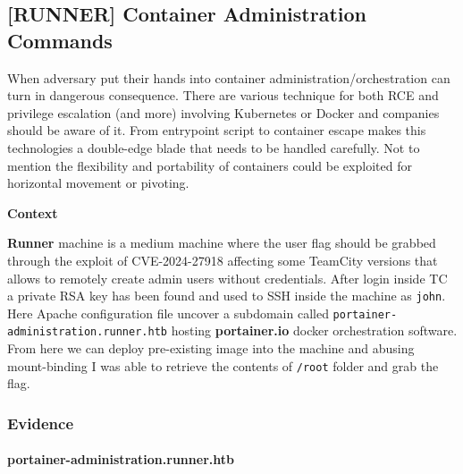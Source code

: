\documentclass[a4paper]{article}
\newcommand{\passthrough}[1]{\colorbox{code}{\lstset{mathescape=false}#1}}
\begin{document}
    \clearpage

    

      \newpage
    
    \subsection{[RUNNER] Container Administration Commands}
    \label{4:RUNNER:issue.md}

    When adversary put their hands into container administration/orchestration can turn in dangerous consequence. There are various
technique for both RCE and privilege escalation (and more) involving Kubernetes or Docker and companies should be aware of it. From entrypoint
script to container escape makes this technologies a double-edge blade that needs to be handled carefully. Not to mention the flexibility and portability
of containers could be exploited for horizontal movement or pivoting.

\textbf{Context}

\textbf{Runner} machine is a medium machine where the user flag should be grabbed through the exploit of CVE-2024-27918 affecting some TeamCity versions that allows to remotely create
admin users without credentials. After login inside TC a private RSA key has been found and used to SSH inside the machine as \passthrough{\lstinline!john!}. Here Apache configuration file uncover a subdomain
called \passthrough{\lstinline!portainer-administration.runner.htb!} hosting \textbf{portainer.io} docker orchestration software. From here we can deploy pre-existing image into the machine and abusing mount-binding
I was able to retrieve the contents of \passthrough{\lstinline!/root!} folder and grab the flag.


    \subsubsection{Evidence}

          \paragraph{portainer-administration.runner.htb}
\end{document}
